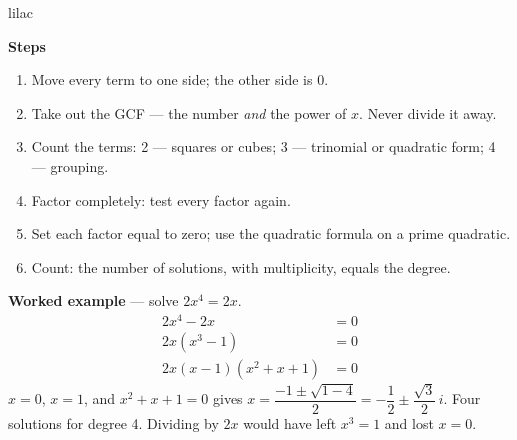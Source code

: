 \documentclass[10pt]{article}
\begin{document}
\begin{skillbox}{lilac}
\begin{minipage}[t]{0.46\linewidth}
\textbf{Steps}
\begin{enumerate}[itemsep=2pt]
  \item Move every term to one side; the other side is 0.
  \item Take out the GCF --- the number \emph{and} the power of $x$. Never divide it away.
  \item Count the terms: 2 --- squares or cubes; 3 --- trinomial or quadratic form; 4 ---
        grouping.
  \item Factor completely: test every factor again.
  \item Set each factor equal to zero; use the quadratic formula on a prime quadratic.
  \item Count: the number of solutions, with multiplicity, equals the degree.
\end{enumerate}
\end{minipage}\hfill
\begin{minipage}[t]{0.5\linewidth}
\textbf{Worked example} --- solve $2x^4 = 2x$.
\[\begin{aligned}
  2x^4 - 2x &= 0 \\
  2x(x^3 - 1) &= 0 \\
  2x(x - 1)(x^2 + x + 1) &= 0
\end{aligned}\]
$x = 0$, $x = 1$, and $x^2 + x + 1 = 0$ gives
$x = \dfrac{-1 \pm \sqrt{1 - 4}}{2} = -\dfrac{1}{2} \pm \dfrac{\sqrt{3}}{2}\,i$. Four solutions for
degree 4. Dividing by $2x$ would have left $x^3 = 1$ and lost $x = 0$.
\end{minipage}
\end{skillbox}
\end{document}
